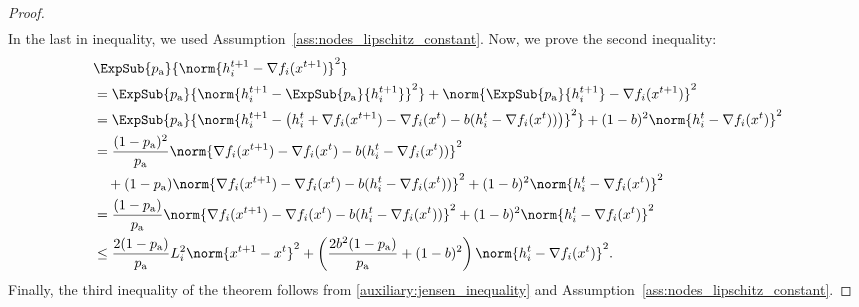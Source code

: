 \documentclass{article}
\newcommand*{\probavailable}{\ensuremath{p_{\textnormal{a}}}}
\begin{document}
\begin{proof}
\begin{align*}
  \end{align*}
  In the last in inequality, we used Assumption~\ref{ass:nodes_lipschitz_constant}. Now, we prove the second inequality:
  \begin{align*}
    &\ExpSub{\probavailable}{\norm{h^{t+1}_i - \nabla f_i(x^{t+1})}^2} \\
    &=\ExpSub{\probavailable}{\norm{h^{t+1}_i - \ExpSub{\probavailable}{h^{t+1}_i}}^2} + \norm{\ExpSub{\probavailable}{h^{t+1}_i  } - \nabla f_i(x^{t+1})}^2 \\
    &=\ExpSub{\probavailable}{\norm{h^{t+1}_i - \left(h^{t}_i + \nabla f_i(x^{t+1}) - \nabla f_i(x^{t}) - b(h^t_i - \nabla f_i(x^{t}))\right)}^2} + (1 - b)^2 \norm{h^{t}_i - \nabla f_i(x^{t})}^2 \\
    &=\frac{(1 - \probavailable)^2}{\probavailable} \norm{\nabla f_i(x^{t+1}) - \nabla f_i(x^{t}) - b(h^t_i - \nabla f_i(x^{t}))}^2 \\
    &\quad + (1 - \probavailable)\norm{\nabla f_i(x^{t+1}) - \nabla f_i(x^{t}) - b(h^t_i - \nabla f_i(x^{t}))}^2 + (1 - b)^2 \norm{h^{t}_i - \nabla f_i(x^{t})}^2 \\
    &=\frac{(1 - \probavailable)}{\probavailable} \norm{\nabla f_i(x^{t+1}) - \nabla f_i(x^{t}) - b(h^t_i - \nabla f_i(x^{t}))}^2 + (1 - b)^2 \norm{h^{t}_i - \nabla f_i(x^{t})}^2 \\
    &\leq \frac{2(1 - \probavailable)}{\probavailable} L^2_i \norm{x^{t+1} - x^{t}}^2 + \left(\frac{2 b^2 (1 - \probavailable)}{\probavailable} + (1 - b)^2\right) \norm{h^{t}_i - \nabla f_i(x^{t})}^2.
  \end{align*}
  Finally, the third inequality of the theorem follows from \eqref{auxiliary:jensen_inequality} and Assumption~\ref{ass:nodes_lipschitz_constant}.
\end{proof}

\CONVERGENCE*
\end{document}
